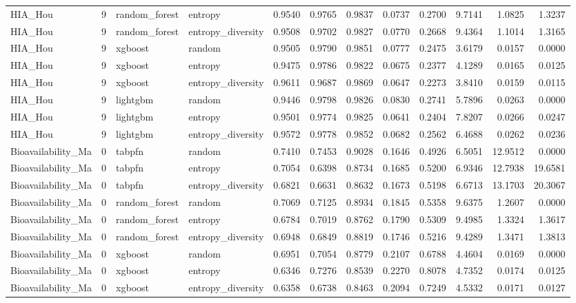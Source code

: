 \begin{tabular}{lrllrrrrrrrr}
HIA_Hou & 9 & random_forest & entropy & 0.9540 & 0.9765 & 0.9837 & 0.0737 & 0.2700 & 9.7141 & 1.0825 & 1.3237 \\
HIA_Hou & 9 & random_forest & entropy_diversity & 0.9508 & 0.9702 & 0.9827 & 0.0770 & 0.2668 & 9.4364 & 1.1014 & 1.3165 \\
HIA_Hou & 9 & xgboost & random & 0.9505 & 0.9790 & 0.9851 & 0.0777 & 0.2475 & 3.6179 & 0.0157 & 0.0000 \\
HIA_Hou & 9 & xgboost & entropy & 0.9475 & 0.9786 & 0.9822 & 0.0675 & 0.2377 & 4.1289 & 0.0165 & 0.0125 \\
HIA_Hou & 9 & xgboost & entropy_diversity & 0.9611 & 0.9687 & 0.9869 & 0.0647 & 0.2273 & 3.8410 & 0.0159 & 0.0115 \\
HIA_Hou & 9 & lightgbm & random & 0.9446 & 0.9798 & 0.9826 & 0.0830 & 0.2741 & 5.7896 & 0.0263 & 0.0000 \\
HIA_Hou & 9 & lightgbm & entropy & 0.9501 & 0.9774 & 0.9825 & 0.0641 & 0.2404 & 7.8207 & 0.0266 & 0.0247 \\
HIA_Hou & 9 & lightgbm & entropy_diversity & 0.9572 & 0.9778 & 0.9852 & 0.0682 & 0.2562 & 6.4688 & 0.0262 & 0.0236 \\
Bioavailability_Ma & 0 & tabpfn & random & 0.7410 & 0.7453 & 0.9028 & 0.1646 & 0.4926 & 6.5051 & 12.9512 & 0.0000 \\
Bioavailability_Ma & 0 & tabpfn & entropy & 0.7054 & 0.6398 & 0.8734 & 0.1685 & 0.5200 & 6.9346 & 12.7938 & 19.6581 \\
Bioavailability_Ma & 0 & tabpfn & entropy_diversity & 0.6821 & 0.6631 & 0.8632 & 0.1673 & 0.5198 & 6.6713 & 13.1703 & 20.3067 \\
Bioavailability_Ma & 0 & random_forest & random & 0.7069 & 0.7125 & 0.8934 & 0.1845 & 0.5358 & 9.6375 & 1.2607 & 0.0000 \\
Bioavailability_Ma & 0 & random_forest & entropy & 0.6784 & 0.7019 & 0.8762 & 0.1790 & 0.5309 & 9.4985 & 1.3324 & 1.3617 \\
Bioavailability_Ma & 0 & random_forest & entropy_diversity & 0.6948 & 0.6849 & 0.8819 & 0.1746 & 0.5216 & 9.4289 & 1.3471 & 1.3813 \\
Bioavailability_Ma & 0 & xgboost & random & 0.6951 & 0.7054 & 0.8779 & 0.2107 & 0.6788 & 4.4604 & 0.0169 & 0.0000 \\
Bioavailability_Ma & 0 & xgboost & entropy & 0.6346 & 0.7276 & 0.8539 & 0.2270 & 0.8078 & 4.7352 & 0.0174 & 0.0125 \\
Bioavailability_Ma & 0 & xgboost & entropy_diversity & 0.6358 & 0.6738 & 0.8463 & 0.2094 & 0.7249 & 4.5332 & 0.0171 & 0.0127 \\

\end{tabular}
